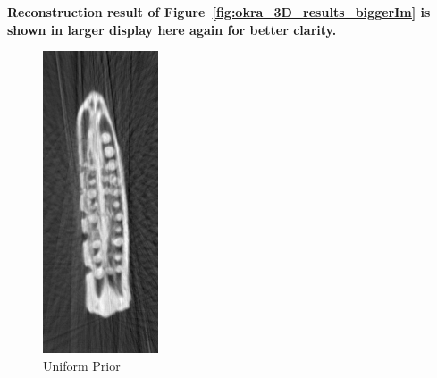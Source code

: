 \documentclass{article}
\begin{document}
\textbf{Reconstruction result of Figure~\ref{fig:okra_3D_results_biggerIm}  is shown in larger display here  again for better clarity.}
\begin{figure}[!h]
\centering
       \includegraphics[width=0.5\columnwidth]{../images/okra/pca_cropped.png}
\captionsetup{labelformat=empty}
        \caption{\large{Uniform Prior}}
\end{figure}
\newpage
\end{document}
